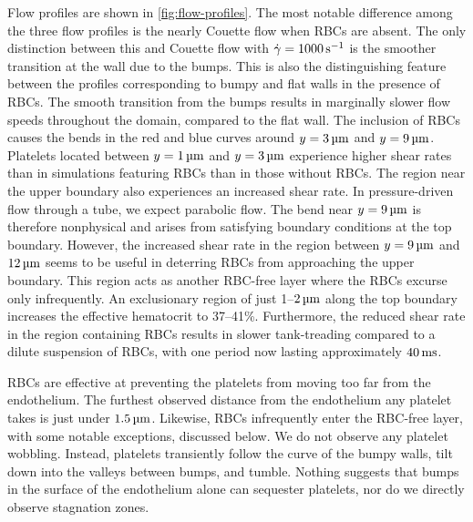 Flow profiles are shown in \cref{fig:flow-profiles}. The most notable difference among the three flow profiles is
the nearly Couette flow when RBCs are absent. The only distinction between this and Couette flow with
$\shear=1000\persec$ is the smoother transition at the wall due to the bumps. This is also the distinguishing
feature between the profiles corresponding to bumpy and flat walls in the presence of RBCs. The smooth transition
from the bumps results in marginally slower flow speeds throughout the domain, compared to the flat wall. The
inclusion of RBCs causes the bends in the red and blue curves around $y = 3\um$ and $y = 9\um$. Platelets located
between $y=1\um$ and $y=3\um$ experience higher shear rates than in simulations featuring RBCs than in those
without RBCs. The region near the upper boundary also experiences an increased shear rate. In pressure-driven flow
through a tube, we expect parabolic flow. The bend near $y = 9\um$ is therefore nonphysical and arises from
satisfying boundary conditions at the top boundary. However, the increased shear rate in the region between $y =
9\um$ and $12\um$ seems to be useful in deterring RBCs from approaching the upper boundary. This region acts as
another RBC-free layer where the RBCs excurse only infrequently. An exclusionary region of just 1--$2\um$ along
the top boundary increases the effective hematocrit to 37--41\%. Furthermore, the reduced shear rate in the region
containing RBCs results in slower tank-treading compared to a dilute suspension of RBCs, with one period now
lasting approximately $40\ms$.

RBCs are effective at preventing the platelets from moving too far from the endothelium. The furthest observed
distance from the endothelium any platelet takes is just under $1.5\um$. Likewise, RBCs infrequently enter the
RBC-free layer, with some notable exceptions, discussed below. We do not observe any platelet wobbling. Instead,
platelets transiently follow the curve of the bumpy walls, tilt down into the valleys between bumps, and tumble.
Nothing suggests that bumps in the surface of the endothelium alone can sequester platelets, nor do we directly
observe stagnation zones.

